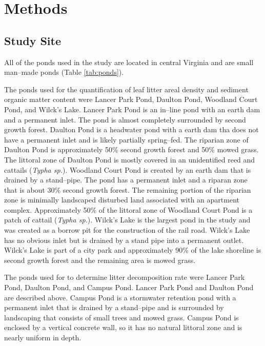 \documentclass{article}
\begin{document}
\section{Methods}
\subsection{Study Site}
All of the ponds used in the study are located in central Virginia and are small man--made ponds (Table \ref{tab:ponds}).

The ponds used for the quantification of leaf litter areal density and sediment organic matter content were Lancer Park Pond, Daulton Pond, Woodland Court Pond, and Wilck's Lake. Lancer Park Pond is an in--line pond with an earth dam and a permanent inlet. The pond is almost completely surrounded by second growth forest. Daulton Pond is a headwater pond with a earth dam tha does not have a permanent inlet and is likely partially spring--fed. The riparian zone of Daulton Pond is approximately 50\% second growth forest and 50\% mowed grass. The littoral zone of Daulton Pond is mostly covered in an unidentified reed and cattails (\emph{Typha sp.}). Woodland Court Pond is created by an earth dam that is drained by a stand--pipe. The pond has a permanent inlet and a riparan zone that is about 30\% second growth forest. The remaining portion of the riparian zone is minimally landscaped disturbed land associated with an apartment complex. Approximately 50\% of the littoral zone of Woodland Court Pond is a patch of cattail (\emph{Typha sp.}).  Wilck's Lake is the largest pond in the study and was created as a borrow pit for the construction of the rail road. Wilck's Lake has no obvious inlet but is drained by a stand pipe into a permanent outlet. Wilck's Lake is part of a city park and approximately 90\% of the lake shoreline is second growth forest and the remaining area is mowed grass.
 

The ponds used for to determine litter decomposition rate were Lancer Park Pond, Daulton Pond, and Campus Pond. Lancer Park Pond and Daulton Pond are described above. Campus Pond is a stormwater retention pond with a permanent inlet that is drained by a stand--pipe and is surrounded by landscaping that consists of small trees and mowed grass. Campus Pond is enclosed by a vertical concrete wall, so it has no natural littoral zone and is nearly uniform in depth.    
\end{document}
